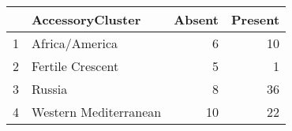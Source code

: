 \begin{table}[ht]
\centering
\begin{tabular}{llrr}
  \hline
 & AccessoryCluster & Absent & Present \\ 
  \hline
1 & Africa/America & 6 & 10 \\ 
  2 & Fertile Crescent & 5 & 1 \\ 
  3 & Russia & 8 & 36 \\ 
  4 & Western Mediterranean & 10 & 22 \\ 
   \hline
\end{tabular}
\end{table}

